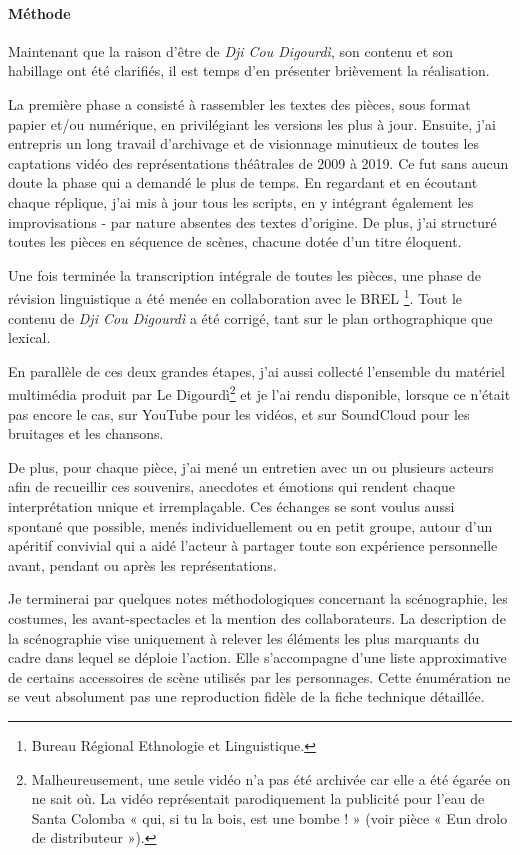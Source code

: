 \paragraph*{Méthode}
Maintenant que la raison d'être de \textit{Dji Cou Digourdì}, son contenu et son habillage ont été clarifiés, il est temps d’en présenter brièvement la réalisation.

La première phase a consisté à rassembler les textes des pièces, sous format papier et/ou numérique, en privilégiant les versions les plus à jour. Ensuite, j'ai entrepris un long travail d’archivage et de visionnage minutieux de toutes les captations vidéo des représentations théâtrales de 2009 à 2019. Ce fut sans aucun doute la phase qui a demandé le plus de temps. En regardant et en écoutant chaque réplique, j'ai mis à jour tous les scripts, en y intégrant également les improvisations - par nature absentes des textes d’origine. De plus, j'ai structuré toutes les pièces en séquence de scènes, chacune dotée d’un titre éloquent.

Une fois terminée la transcription intégrale de toutes les pièces, une phase de révision linguistique a été menée en collaboration avec le BREL \footnote{ Bureau Régional Ethnologie et Linguistique.}. Tout le contenu de \textit{Dji Cou Digourdì} a été corrigé, tant sur le plan orthographique que lexical.

En parallèle de ces deux grandes étapes, j'ai aussi collecté l'ensemble du matériel multimédia produit par Le Digourdì\footnote{ Malheureusement, une seule vidéo n'a pas été archivée car elle a été égarée on ne sait où. La vidéo représentait parodiquement la publicité pour l'eau de Santa Colomba « qui, si tu la bois, est une bombe ! » (voir pièce « Eun drolo de distributeur »).} et je l'ai rendu disponible, lorsque ce n’était pas encore le cas, sur YouTube \href{https://www.youtube.com/@the_digourdi}{\yt} pour les vidéos, et sur SoundCloud \href{https://soundcloud.com/user-234168361/sets}{\pppp} pour les bruitages et les chansons.

De plus, pour chaque pièce, j'ai mené un entretien avec un ou plusieurs acteurs afin de recueillir ces souvenirs, anecdotes et émotions qui rendent chaque interprétation unique et irremplaçable. Ces échanges se sont voulus aussi spontané que possible, menés individuellement ou en petit groupe, autour d'un apéritif convivial qui a aidé l'acteur à partager toute son expérience personnelle avant, pendant ou après les représentations.

Je terminerai par quelques notes méthodologiques concernant la scénographie, les costumes, les avant-spectacles et la mention des collaborateurs.
La description de la scénographie vise uniquement à relever les éléments les plus marquants du cadre dans lequel se déploie l’action. Elle s’accompagne d’une liste approximative de certains accessoires de scène utilisés par les personnages. Cette énumération ne se veut absolument pas une reproduction fidèle de la fiche technique détaillée.

